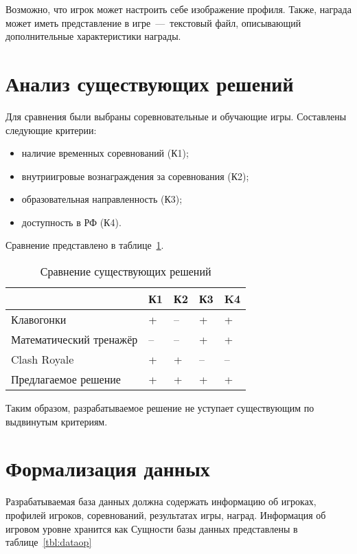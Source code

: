 Возможно, что игрок может настроить себе изображение профиля. Также, награда может иметь представление в игре~---~текстовый файл, описывающий дополнительные характеристики награды.



\section{Анализ существующих решений}

Для сравнения были выбраны соревновательные и обучающие игры. Составлены следующие критерии:
\begin{itemize}
	\item наличие временных соревнований (К1);
	\item внутриигровые вознаграждения за соревнования (К2);
	\item образовательная направленность (К3);
	\item доступность в РФ (К4).
\end{itemize}

Сравнение представлено в таблице~\ref{tbl:comparison}. 

\begin{table}[h!]
	\centering
	\caption{\label{tbl:comparison}Сравнение существующих решений}
	\begin{tabular}{|l|l|l|l|l|}
		\hline
		& К1 & К2 & К3 & K4\\\hline
		Клавогонки & + & -- & + & + \\\hline
		Математический тренажёр & -- & -- & + & +\\\hline
		Clash Royale  & + & + & -- & --\\\hline
		Предлагаемое решение & + & + & + & + \\\hline
	\end{tabular}
\end{table}
\FloatBarrier

Таким образом, разрабатываемое решение не уступает существующим по выдвинутым критериям.

\section{Формализация данных}
Разрабатываемая база данных должна содержать информацию об игроках, профилей игроков, соревнований, результатах игры, наград. Информация об игровом уровне хранится как Сущности базы данных представлены в таблице~\ref{tbl:dataop}

